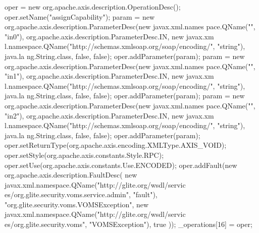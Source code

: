 \begin{DoxyCode}
{        oper = new org.apache.axis.description.OperationDesc();
        oper.setName("assignCapability");
        param = new org.apache.axis.description.ParameterDesc(new javax.xml.names
      pace.QName("", "in0"), org.apache.axis.description.ParameterDesc.IN, new javax.xm
      l.namespace.QName("http://schemas.xmlsoap.org/soap/encoding/", "string"), java.la
      ng.String.class, false, false);
        oper.addParameter(param);
        param = new org.apache.axis.description.ParameterDesc(new javax.xml.names
      pace.QName("", "in1"), org.apache.axis.description.ParameterDesc.IN, new javax.xm
      l.namespace.QName("http://schemas.xmlsoap.org/soap/encoding/", "string"), java.la
      ng.String.class, false, false);
        oper.addParameter(param);
        param = new org.apache.axis.description.ParameterDesc(new javax.xml.names
      pace.QName("", "in2"), org.apache.axis.description.ParameterDesc.IN, new javax.xm
      l.namespace.QName("http://schemas.xmlsoap.org/soap/encoding/", "string"), java.la
      ng.String.class, false, false);
        oper.addParameter(param);
        oper.setReturnType(org.apache.axis.encoding.XMLType.AXIS_VOID);
        oper.setStyle(org.apache.axis.constants.Style.RPC);
        oper.setUse(org.apache.axis.constants.Use.ENCODED);
        oper.addFault(new org.apache.axis.description.FaultDesc(
                      new javax.xml.namespace.QName("http://glite.org/wsdl/servic
      es/org.glite.security.voms.service.admin", "fault"),
                      "org.glite.security.voms.VOMSException",
                      new javax.xml.namespace.QName("http://glite.org/wsdl/servic
      es/org.glite.security.voms", "VOMSException"), 
                      true
                     ));
        _operations[16] = oper;

}
\end{DoxyCode}
